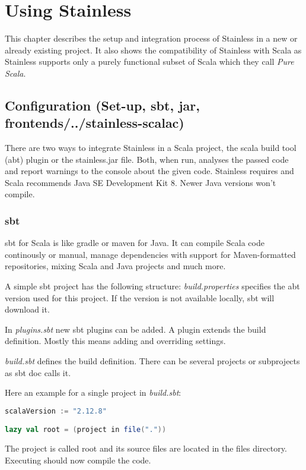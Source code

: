\chapter{Using Stainless}
\label{chap:using_stainless}
This chapter describes the setup and integration process of Stainless in a new or already existing project.
It also shows the compatibility of Stainless with Scala as Stainless supports only a purely functional subset of Scala which they call \emph{Pure Scala}.

\section{Configuration (Set-up, sbt, jar, frontends/../stainless-scalac)}
There are two ways to integrate Stainless in a Scala project, the scala build tool (abt) plugin or the stainless.jar file.
Both, when run, analyses the passed code and report warnings to the console about the given code.
Stainless requires and Scala recommends Java SE Development Kit 8.
Newer Java versions won't compile.

\subsection{sbt}
sbt for Scala is like gradle or maven for Java.
It can compile Scala code continously or manual, manage dependencies with support for Maven-formatted repositories, mixing Scala and Java projects and much more.

A simple sbt project has the following structure:
\emph{build.properties} specifies the abt version used for this project.
If the version is not available locally, sbt will download it.

In \emph{plugins.sbt} new sbt plugins can be added.
A plugin extends the build definition.
Mostly this means adding and overriding settings.

\emph{build.sbt} defines the build definition.
There can be several projects or subprojects as sbt doc calls it.

Here an example for a single project in \emph{build.sbt}:
\begin{lstlisting}[language=scala]
scalaVersion := "2.12.8"

lazy val root = (project in file("."))
\end{lstlisting}
The project is called root and its source files are located in the files directory.
Executing  should now compile the code.

